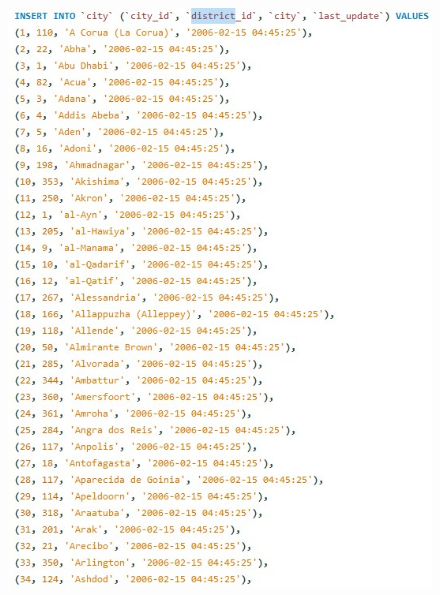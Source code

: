 \documentclass{article}
\begin{document}
		\begin{figure}[H]
			\includegraphics[height=16cm]{district1_insert_norm}

\end{figure}
\end{document}
